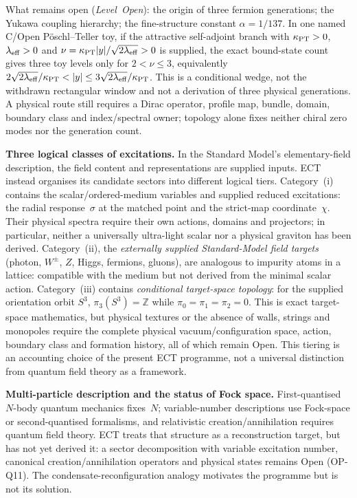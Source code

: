 \documentclass[11pt,a4paper]{article}
\begin{document}
What remains open (\emph{Level~Open}): the origin of three fermion
generations; the Yukawa coupling hierarchy; the fine-structure constant
$\alpha=1/137$.  In one named C/Open P\"oschl--Teller toy, if the attractive
self-adjoint branch with $\kappa_{\rm PT}>0$, $\lambda_{\rm eff}>0$ and
$\nu=\kappa_{\rm PT}|y|/\sqrt{2\lambda_{\rm eff}}>0$ is supplied, the exact
bound-state count gives three toy levels only for $2<\nu\le3$, equivalently
$2\sqrt{2\lambda_{\rm eff}}/\kappa_{\rm PT}<|y|\le
3\sqrt{2\lambda_{\rm eff}}/\kappa_{\rm PT}$.  This is a conditional wedge,
not the withdrawn rectangular window and not a derivation of three physical
generations.  A physical route still requires a Dirac operator, profile map,
bundle, domain, boundary class and index/spectral owner; topology alone fixes
neither chiral zero modes nor the generation count.

\textbf{Three logical classes of excitations.}
In the Standard Model's elementary-field description, the field content and
representations are supplied inputs.  ECT instead organises its candidate
sectors into different logical tiers.
Category~(i) contains the scalar/ordered-medium variables and supplied reduced
excitations: the radial response~$\sigma$ at the matched point and the
strict-map coordinate~$\chi$.  Their physical spectra require their own
actions, domains and projectors; in particular, neither a universally
ultra-light scalar nor a physical graviton has been derived.
Category~(ii), the \emph{externally supplied Standard-Model field targets}
(photon, $W^\pm$, $Z$, Higgs, fermions, gluons), are analogous to impurity
atoms in a lattice: compatible with the medium but not derived from the
minimal scalar action.
Category~(iii) contains \emph{conditional target-space topology}: for the supplied orientation orbit $S^3$, $\pi_3(S^3)=\mathbb Z$ while $\pi_0=\pi_1=\pi_2=0$.  This is exact target-space mathematics, but physical textures or the absence of walls, strings and monopoles require the complete physical vacuum/configuration space, action, boundary class and formation history, all of which remain Open.
This tiering is an accounting choice of the present ECT programme, not a
universal distinction from quantum field theory as a framework.

\textbf{Multi-particle description and the status of Fock space.}
First-quantised $N$-body quantum mechanics fixes~$N$; variable-number
descriptions use Fock-space or second-quantised formalisms, and relativistic
creation/annihilation requires quantum field theory.  ECT treats that
structure as a reconstruction target, but has not yet derived it: a sector
decomposition with variable excitation number, canonical
creation/annihilation operators and physical states remains Open (OP-Q11).
The condensate-reconfiguration analogy motivates the programme but is not its
solution.
\end{document}

